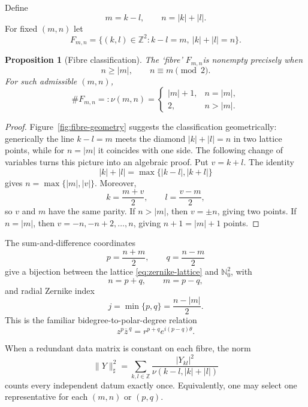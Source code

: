 \IfFileExists{iopjournal.cls}{\documentclass{iopjournal}}{\documentclass{iopjournal-draft}}
\newtheorem{proposition}[theorem]{Proposition}
\theoremstyle{definition}
\theoremstyle{remark}
\newcommand{\norm}[1]{\lVert #1\rVert}
\newcommand{\N}{\mathbb N}
\newcommand{\Z}{\mathbb Z}
\numberwithin{equation}{section}
\begin{document}
Define
\begin{equation}
 m=k-l,\qquad n=|k|+|l|.
 \label{eq:mn}
\end{equation}
For fixed $(m,n)$ let
\[
 F_{m,n}=\{(k,l)\in\Z^2:k-l=m,\ |k|+|l|=n\}.
\]

\begin{proposition}[Fibre classification]
\label{prop:fibres}
The `fibre' $F_{m,n}$is nonempty precisely when
\begin{equation}
 n\geq |m|,\qquad n\equiv m\pmod 2.
 \label{eq:zernike-lattice}
\end{equation}
For such admissible $(m,n)$,
\begin{equation}
 \#F_{m,n}=:\nu(m,n)=
 \begin{cases}
 |m|+1,&n=|m|,\\
 2,&n>|m|.
 \end{cases}
 \label{eq:fibre-multiplicity}
\end{equation}
\end{proposition}

\begin{proof}
	Figure~\ref{fig:fibre-geometry} suggests the classification
	geometrically: generically the line $k-l=m$ meets the diamond
	$|k|+|l|=n$ in two lattice points, while for $n=|m|$ it coincides
	with one side.  The following change of variables turns this picture
	into an algebraic proof.
Put $v=k+l$.  The identity
\begin{equation}
 |k|+|l|=\max\{|k-l|,|k+l|\}
 \label{eq:max-identity}
\end{equation}
gives $n=\max\{|m|,|v|\}$.  Moreover,
\[
 k=\frac{m+v}{2},\qquad l=\frac{v-m}{2},
\]
so $v$ and $m$ have the same parity.  If $n>|m|$, then $v=\pm n$, giving two points.  If $n=|m|$, then $v=-n,-n+2,\ldots,n$, giving $n+1=|m|+1$ points.
\end{proof}

The sum-and-difference coordinates
\begin{equation}
 p=\frac{n+m}{2},\qquad q=\frac{n-m}{2}
 \label{eq:pq}
\end{equation}
give a bijection between the lattice \eqref{eq:zernike-lattice} and $\N_0^2$, with
\[
 n=p+q,\qquad m=p-q,
\]
and radial Zernike index
\begin{equation}
 j=\min\{p,q\}=\frac{n-|m|}{2}.
 \label{eq:radial-index}
\end{equation}
This is the familiar bidegree-to-polar-degree relation
\[
 z^p\overline z^{\,q}=r^{p+q}e^{i(p-q)\theta}.
\]

When a redundant data matrix is constant on each fibre, the norm
\begin{equation}
 \norm Y_\sharp^2=
 \sum_{k,l\in\Z}\frac{|Y_{kl}|^2}{\nu(k-l,|k|+|l|)}
 \label{eq:sharp-data-norm}
\end{equation}
counts every independent datum exactly once.  Equivalently, one may select one representative for each $(m,n)$ or $(p,q)$.
\end{document}
